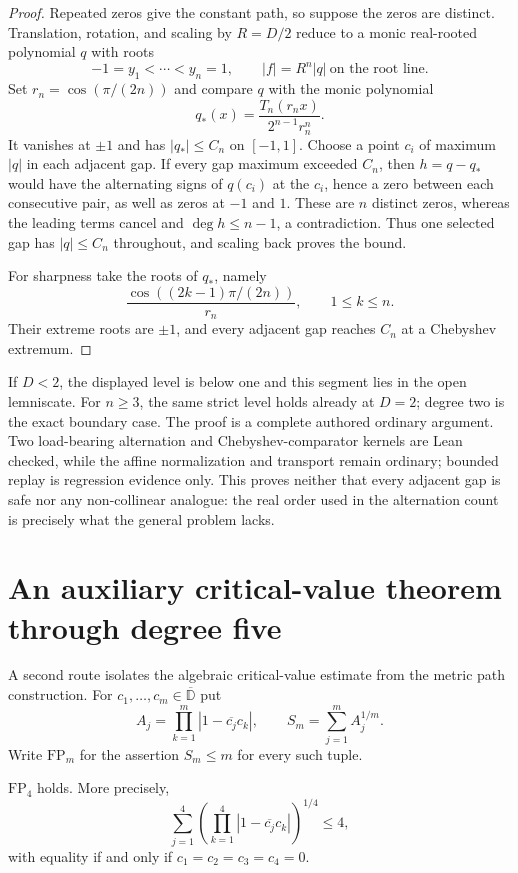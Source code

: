 \documentclass[11pt]{article}
\begin{document}
\begin{proof}
Repeated zeros give the constant path, so suppose the zeros are distinct.
Translation, rotation, and scaling by $R=D/2$ reduce to a monic real-rooted
polynomial $q$ with roots
\[
 -1=y_1<\cdots<y_n=1,
 \qquad |f|=R^n|q|\ \text{on the root line}.
\]
Set $r_n=\cos(\pi/(2n))$ and compare $q$ with the monic polynomial
\[
 q_*(x)=\frac{T_n(r_nx)}{2^{n-1}r_n^n}.
\]
It vanishes at $\pm1$ and has $|q_*|\le C_n$ on $[-1,1]$.  Choose a point
$c_i$ of maximum $|q|$ in each adjacent gap.  If every gap maximum exceeded
$C_n$, then $h=q-q_*$ would have the alternating signs of $q(c_i)$ at the
$c_i$, hence a zero between each consecutive pair, as well as zeros at
$-1$ and $1$.  These are $n$ distinct zeros, whereas the leading terms cancel
and $\deg h\le n-1$, a contradiction.  Thus one selected gap has
$|q|\le C_n$ throughout, and scaling back proves the bound.

For sharpness take the roots of $q_*$, namely
\[
 \frac{\cos((2k-1)\pi/(2n))}{r_n},\qquad 1\le k\le n.
\]
Their extreme roots are $\pm1$, and every adjacent gap reaches $C_n$ at a
Chebyshev extremum.
\end{proof}

If $D<2$, the displayed level is below one and this segment lies in the open
lemniscate.  For $n\ge3$, the same strict level holds already at $D=2$;
degree two is the exact boundary case.  The proof is a complete authored
ordinary argument.  Two load-bearing alternation and Chebyshev-comparator
kernels are Lean checked, while the affine normalization and transport remain
ordinary; bounded replay is regression evidence only.  This proves neither
that every adjacent gap is safe nor any non-collinear analogue: the real order
used in the alternation count is precisely what the general problem lacks.

\section{An auxiliary critical-value theorem through degree five}
\label{sec:freepoint}

A second route isolates the algebraic critical-value estimate from the metric
path construction.  For $c_1,\ldots,c_m\in\overline{\mathbb D}$ put
\[
 A_j=\prod_{k=1}^m |1-\overline{c_j}c_k|,
 \qquad
 S_m=\sum_{j=1}^m A_j^{1/m}.
\]
Write $\mathrm{FP}_m$ for the assertion $S_m\le m$ for every such tuple.

\begin{theorem}\label{res:fp4}
$\mathrm{FP}_4$ holds.  More precisely,
\[
 \sum_{j=1}^4
   \left(\prod_{k=1}^4|1-\overline{c_j}c_k|\right)^{1/4}
 \le4,
\]
with equality if and only if $c_1=c_2=c_3=c_4=0$.
\end{theorem}
\end{document}
